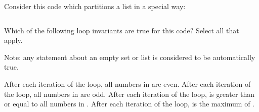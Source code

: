 \Needspace{4.5in}
\begin{prob}
    Consider this code which partitions a list in a special way:

    \inputminted[lastline=15]{python}{\thisdir/code.py}

    Which of the following loop invariants are true for this code? Select all
    that apply.

    Note: any statement about an empty set or list is considered to be automatically true.

    \begin{choices}[rectangle]
        \correctchoice After each iteration of the  loop, all numbers in
             are even.
        \choice After each iteration of the  loop, all numbers in
             are odd.
        \correctchoice After each iteration of the  loop,
             is greater than or equal to all numbers in
            .
        \choice After each iteration of the  loop,
             is the maximum of .
    \end{choices}

\end{prob}
